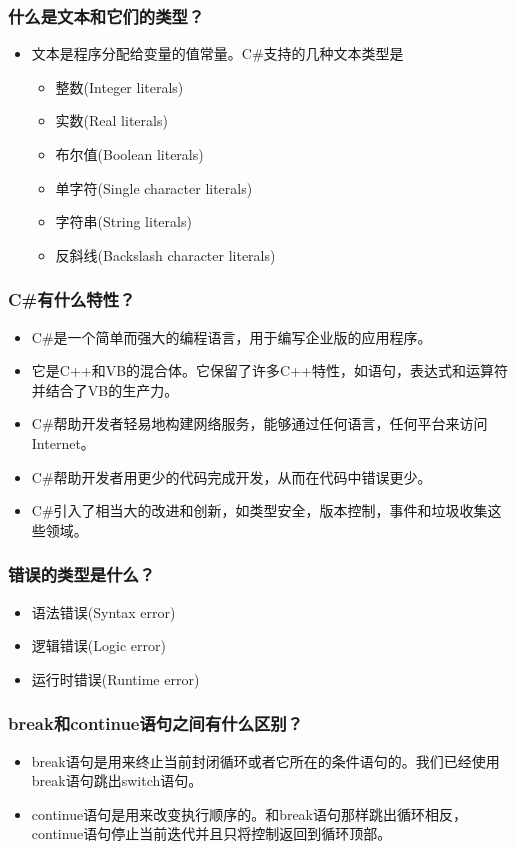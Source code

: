 \documentclass[9pt, b5paper]{article}
\begin{document}
\subsubsection{什么是文本和它们的类型？}
\label{sec-1-2-7}
\begin{itemize}
\item 文本是程序分配给变量的值常量。C\#支持的几种文本类型是
\begin{itemize}
\item 整数(Integer literals)
\item 实数(Real literals)
\item 布尔值(Boolean literals)
\item 单字符(Single character literals)
\item 字符串(String literals)
\item 反斜线(Backslash character literals)
\end{itemize}
\end{itemize}
\subsubsection{C\#有什么特性？}
\label{sec-1-2-8}
\begin{itemize}
\item C\#是一个简单而强大的编程语言，用于编写企业版的应用程序。
\item 它是C++和VB的混合体。它保留了许多C++特性，如语句，表达式和运算符并结合了VB的生产力。
\item C\#帮助开发者轻易地构建网络服务，能够通过任何语言，任何平台来访问Internet。
\item C\#帮助开发者用更少的代码完成开发，从而在代码中错误更少。
\item C\#引入了相当大的改进和创新，如类型安全，版本控制，事件和垃圾收集这些领域。
\end{itemize}
\subsubsection{错误的类型是什么？}
\label{sec-1-2-9}
\begin{itemize}
\item 语法错误(Syntax error)
\item 逻辑错误(Logic error)
\item 运行时错误(Runtime error)
\end{itemize}
\subsubsection{break和continue语句之间有什么区别？}
\label{sec-1-2-10}
\begin{itemize}
\item break语句是用来终止当前封闭循环或者它所在的条件语句的。我们已经使用break语句跳出switch语句。
\item continue语句是用来改变执行顺序的。和break语句那样跳出循环相反，continue语句停止当前迭代并且只将控制返回到循环顶部。
\end{itemize}
\end{document}
